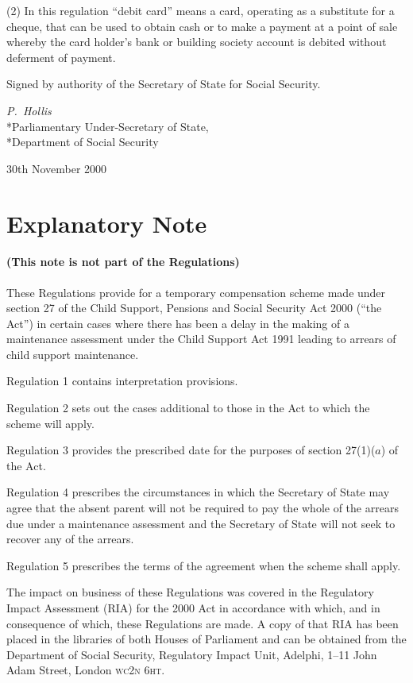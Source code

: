 \documentclass[12pt,a4paper]{article}
\begin{document}
(2) In this regulation “debit card” means a card, operating as a substitute for a cheque, that can be used to obtain cash or to make a payment at a point of sale whereby the card holder’s bank or building society account is debited without deferment of payment. 

\bigskip

Signed 
by authority of the Secretary of State for Social Security.

{\raggedleft
\emph{P.~Hollis}\\*Parliamentary Under-Secretary of State,\\*Department of Social Security

}

30th November 2000

\small

\part{Explanatory Note}

\renewcommand\parthead{--- Explanatory Note}

\subsection*{(This note is not part of the Regulations)}

These Regulations provide for a temporary compensation scheme made under section 27 of the Child Support, Pensions and Social Security Act 2000 (“the Act”) in certain cases where there has been a delay in the making of a maintenance assessment under the Child Support Act 1991 leading to arrears of child support maintenance.

Regulation 1 contains interpretation provisions.

Regulation 2 sets out the cases additional to those in the Act to which the scheme will apply.

Regulation 3 provides the prescribed date for the purposes of section 27(1)($a$)  of the Act.

Regulation 4 prescribes the circumstances in which the Secretary of State may agree that the absent parent will not be required to pay the whole of the arrears due under a maintenance assessment and the Secretary of State will not seek to recover any of the arrears.

Regulation 5 prescribes the terms of the agreement when the scheme shall apply.

The impact on business of these Regulations was covered in the Regulatory Impact Assessment (RIA) for the 2000 Act in accordance with which, and in consequence of which, these Regulations are made. A copy of that RIA has been placed in the libraries of both Houses of Parliament and can be obtained from the Department of Social Security, Regulatory Impact Unit, Adelphi, 1--11 John Adam Street, London \textsc{\lowercase{WC2N 6HT}}.  
\end{document}

